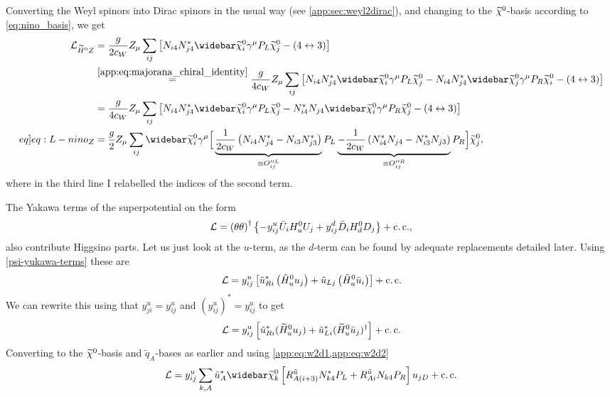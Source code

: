 \documentclass[english, notitlepage]{article}
\begin{document}
Converting the Weyl spinors into Dirac spinors in the usual way (see
\cref{app:sec:weyl2dirac}), and changing to the \(\nino\)-basis according
to
\cref{eq:nino_basis}, we get
\begin{align}
    \nonumber
    \L_{\wtilde{H}^0Z} & = \frac{g}{2c_W} Z_\mu \sum_{ij}
    \bclosed{N_{i4}N_{j4}^\ast \barnino[i]\gamma^\mu P_L \nino[j] - (4
    \leftrightarrow 3)}
    \\
    \nonumber
                       &
    \stackrel{\mathrm{\cref{app:eq:majorana_chiral_identity}}}{=}
    \frac{g}{4c_W}
    Z_\mu \sum_{ij} \bclosed{N_{i4}N_{j4}^\ast \barnino[i]\gamma^\mu P_L
    \nino[j] -
    N_{i4}N_{j4}^\ast \barnino[j]\gamma^\mu P_R \nino[i] - (4
    \leftrightarrow
    3)}
    \\
    \nonumber
                       & = \frac{g}{4c_W} Z_\mu \sum_{ij}
    \bclosed{N_{i4}N_{j4}^\ast \barnino[i]\gamma^\mu P_L \nino[j] -
    N_{i4}^\ast
    N_{j4} \barnino[i]\gamma^\mu P_R \nino[j] - (4 \leftrightarrow 3)}
    \\
    \label[eq]{eq:L-nino_Z}
                       & = \frac{g}{2} Z_\mu \sum_{ij} \barnino[i]
    \gamma^\mu
    \Big[ \underbrace{\frac{1}{2c_W}\pclosed{N_{i4}N_{j4}^\ast -
    N_{i3}N_{j3}^\ast}}_{\equiv O^{\prime\prime L}_{ij}}P_L
    \underbrace{-\frac{1}{2c_W}\pclosed{N_{i4}^\ast N_{j4} - N_{i3}^\ast
            N_{j3}}}_{\equiv O^{\prime\prime R}_{ij}}P_R \Big] \nino[j],
\end{align}
where in the third line I relabelled the indices of the second term.
\medskip

The Yakawa terms of the superpotential on the form
\begin{equation}
    \L = \pclosed{\theta\theta}^\dagger \cclosed{-y^u_{ij} \bar{U}_i H_u^0
    U_j
    + y^d_{ij} \bar{D}_i H_d^0 D_j} + \cc,
\end{equation}
also contribute Higgsino parts.
Let us just look at the \(u\)-term, as the \(d\)-term can be found by
adequate
replacements detailed later.
Using \cref{psi-yukawa-terms} these are
\begin{align}
    \L = y^u_{ij} \bclosed{\tilde{u}_{Ri}^\ast \pclosed{\tilde{H}_u^0 u_j}
        +
        \tilde{u}_{Lj} \pclosed{\tilde{H}_u^0 \bar{u}_i}} + \cc
\end{align}
We can rewrite this using that \(y^u_{ji} = y^u_{ij}\) and
\((y^u_{ij})^\ast =
y^u_{ij}\) to get
\begin{equation}
    \L = y^u_{ij} \bclosed{\tilde{u}_{Ri}^\ast (\hinou u_j) +
        \tilde{u}_{Li}^\ast (\hinou \bar{u}_j)^\dagger} + \cc
\end{equation}
Converting to the \(\nino[]\)-basis and \(\tilde{q}_A\)-bases as earlier
and
using \cref{app:eq:w2d1,app:eq:w2d2}
\begin{align}
    \L = y^u_{ij} \sum_{k, A} \tilde{u}_A^\ast \barnino[k]
    \bclosed{R^{\tilde{u}}_{A(i+3)} N_{k4}^\ast P_L + R^{\tilde{u}}_{Ai}
        N_{k4}
        P_R} u_{j D} + \cc
\end{align}
\end{document}
